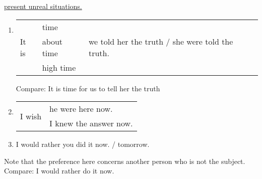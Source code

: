 \begin{enumerate}
        \newline
        \underline{present unreal situations.}
        \begin{enumerate}
            \item
                \begin{tabular}{lll}
                    \multirow{3}{*}{It is} & time       & \multirow{3}{*}{we
                    told her the truth / she were told the truth.} \\
                                           & about time & \\
                                           & high time  &
                \end{tabular}
                \newline
                Compare: It is time for us to tell her the truth
            \item
                \begin{tabular}{ll}
                    \multirow{2}{*}{I wish} & he were here now. \\
                    & I knew the answer now.
                \end{tabular}
            \item I would rather you did it now. / tomorrow.
        \end{enumerate}
        Note that the preference here concerns another person who is not the
        subject.
        \newline
        Compare: I would rather do it now.
\end{enumerate}

